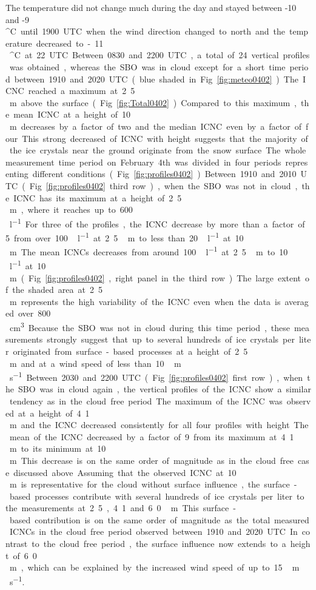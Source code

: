 \documentclass[draft,linenumbers]{agujournal}
\begin{document}
The temperature did not change much during the day and stayed between -10 and -9\,\si{^\circ C} until 1900 UTC when the wind direction changed to north and the temperature decreased to -11\,\si{^\circ C} at 22 UTC.

Between 0830 and 2200 UTC, a total of 24 vertical profiles was obtained, whereas the SBO was in cloud except for a short time period between 1910 and 2020 UTC (blue shaded in Fig. \ref{fig:meteo0402}). The ICNC reached a maximum at 2.5\,\si{m} above the surface (Fig. \ref{fig:Total0402}). Compared to this maximum, the mean ICNC at a height of 10\,\si{m} decreases by a factor of two and the median ICNC even by a factor of four. This strong decreased of ICNC with height suggests that the majority of the ice crystals near the ground originate from the snow surface.

The whole measurement time period on February 4th was divided in four periods representing different conditions (Fig. \ref{fig:profiles0402}). Between 1910 and 2010 UTC (Fig. \ref{fig:profiles0402} third row), when the SBO was not in cloud, the ICNC has its maximum at a height of 2.5\,\si{m}, where it reaches up to 600\,\si{l^{-1}}. For three of the profiles, the ICNC decrease by more than a factor of 5 from over 100\,\si{l^{-1}} at 2.5\,\si{m} to less than 20\,\si{l^{-1}} at 10\,\si{m}. The mean ICNCs decreases from around 100\,\si{l^{-1}} at 2.5\,\si{m} to 10\,\si{l^{-1}} at 10\,\si{m} (Fig. \ref{fig:profiles0402}, right panel in the third row). The large extent of the shaded area at 2.5\,\si{m} represents the high variability of the ICNC even when the data is averaged over 800\,\si{cm^3}. Because the SBO was not in cloud during this time period, these measurements strongly suggest that up to several hundreds of ice crystals per liter originated from surface-based processes at a height of 2.5\,\si{m} and at a wind speed of less than 10\,\si{m\,s^{-1}}. 

Between 2030 and 2200 UTC (Fig. \ref{fig:profiles0402} first row), when the SBO was in cloud again, the vertical profiles of the ICNC show a similar tendency as in the cloud free period. The maximum of the ICNC was observed at a height of 4.1\,\si{m} and the ICNC decreased consistently for all four profiles with height. The mean of the ICNC decreased by a factor of 9 from its maximum at 4.1\,\si{m} to its minimum at 10\,\si{m}. This decrease is on the same order of magnitude as in the cloud free case discussed above. Assuming that the observed ICNC at 10\,\si{m} is representative for the cloud without surface influence, the surface-based processes contribute with several hundreds of ice crystals per liter to the measurements at 2.5, 4.1 and 6.0\,\si{m}. This surface-based contribution is on the same order of magnitude as the total measured ICNCs in the cloud free period observed between 1910 and 2020 UTC. In contrast to the cloud free period, the surface influence now extends to a height of 6.0\,\si{m}, which can be explained by the increased wind speed of up to 15\,\si{m\,s^{-1}}. 
\end{document}
